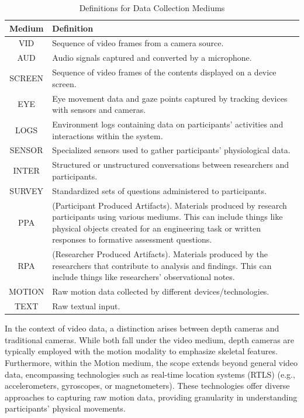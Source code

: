 \documentclass[manuscript,screen,review]{acmart}
\begin{document}
\begin{table}[ht]
  \centering
  \caption{Definitions for Data Collection Mediums}
  \begin{tabular}{|c|p{}|}
    \hline
    \textbf{Medium} & \textbf{Definition} \\
    \hline
    VID & Sequence of video frames from a camera source. \\
    \hline
    AUD & Audio signals captured and converted by a microphone. \\
    \hline
    SCREEN & Sequence of video frames of the contents displayed on a device screen. \\
    \hline
    EYE & Eye movement data and gaze points captured by tracking devices with sensors and cameras. \\
    \hline
    LOGS & Environment logs containing data on participants' activities and interactions within the system. \\
    \hline
    SENSOR & Specialized sensors used to gather participants' physiological data. \\
    \hline
    INTER & Structured or unstructured conversations between researchers and participants. \\
    \hline
    SURVEY & Standardized sets of questions administered to participants. \\
    \hline
    PPA & (Participant Produced Artifacts). Materials produced by research participants using various mediums. This can include things like physical objects created for an engineering task or written responses to formative assessment questions. \\
    \hline
    RPA & (Researcher Produced Artifacts). Materials produced by the researchers that contribute to analysis and findings. This can include things like researchers' observational notes. \\
    \hline
    MOTION & Raw motion data collected by different devices/technologies. \\
    \hline
    TEXT & Raw textual input. \\
    \hline
  \end{tabular}
  \label{tab:data_collection_mediums}
\end{table}

In the context of video data, a distinction arises between depth cameras and traditional cameras. While both fall under the video medium, depth cameras are typically employed with the motion modality to emphasize skeletal features. Furthermore, within the Motion medium, the scope extends beyond general video data, encompassing technologies such as real-time location systems (RTLS) (e.g., accelerometers, gyroscopes, or magnetometers). These technologies offer diverse approaches to capturing raw motion data, providing granularity in understanding participants' physical movements.
\end{document}

